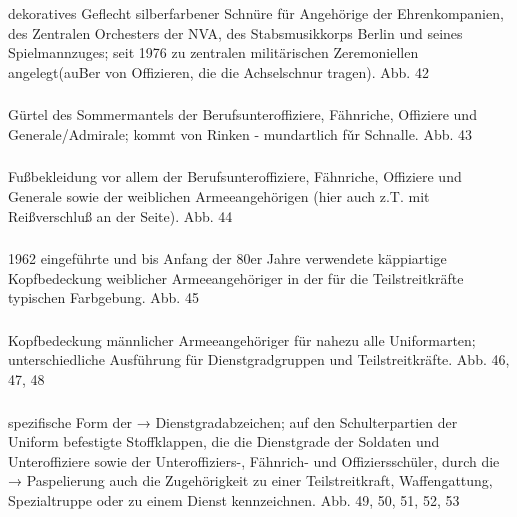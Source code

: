 dekoratives Geflecht silberfarbener Schnüre für Angehörige der Ehrenkompanien, des Zentralen Orchesters der NVA, des Stabsmusikkorps Berlin und seines Spielmannzuges; seit 1976 zu zentralen militärischen Zeremoniellen angelegt(auBer von Offizieren, die die Achselschnur tragen). Abb. 42

\subsubsection*{}%

Gürtel des Sommermantels der Berufsunteroffiziere, Fähnriche, Offiziere und Generale/Admirale; kommt von Rinken - mundartlich fǔr Schnalle. Abb. 43

\subsubsection*{}%

Fußbekleidung vor allem der Berufsunteroffiziere, Fähnriche, Offiziere und Generale sowie der weiblichen Armeeangehörigen (hier auch z.T. mit Reißverschluß an der
Seite). Abb. 44

\subsubsection*{}%

1962 eingeführte und bis Anfang der 80er Jahre verwendete käppiartige Kopfbedeckung weiblicher Armeeangehöriger in der für die Teilstreitkräfte typischen Farbgebung. Abb. 45

\subsubsection*{}%

Kopfbedeckung männlicher Armeeangehöriger für nahezu alle Uniformarten; unterschiedliche Ausführung für Dienstgradgruppen und Teilstreitkräfte. Abb. 46, 47, 48

\subsubsection*{}%

spezifische Form der → Dienstgradabzeichen; auf den Schulterpartien der Uniform befestigte Stoffklappen, die die Dienstgrade der Soldaten und Unteroffiziere sowie der Unteroffiziers-, Fähnrich- und Offiziersschüler, durch die → Paspelierung auch die Zugehörigkeit zu einer Teilstreitkraft, Waffengattung, Spezialtruppe oder zu einem Dienst kennzeichnen. Abb. 49, 50, 51, 52, 53

